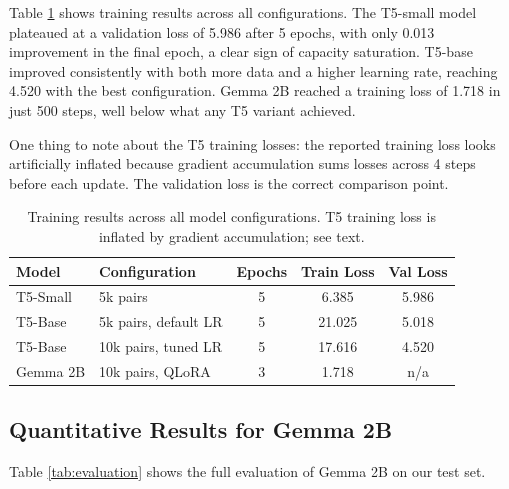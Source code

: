\documentclass{article}
\begin{document}
Table \ref{tab:training_loss} shows training results across all configurations. The T5-small model plateaued at a validation loss of 5.986 after 5 epochs, with only 0.013 improvement in the final epoch, a clear sign of capacity saturation. T5-base improved consistently with both more data and a higher learning rate, reaching 4.520 with the best configuration. Gemma 2B reached a training loss of 1.718 in just 500 steps, well below what any T5 variant achieved.

One thing to note about the T5 training losses: the reported training loss looks artificially inflated because gradient accumulation sums losses across 4 steps before each update. The validation loss is the correct comparison point.

\begin{table}[ht]
\centering
\caption{Training results across all model configurations. T5 training loss is inflated by gradient accumulation; see text.}
\label{tab:training_loss}
\vspace{4pt}
\begin{tabular}{llccc}
\toprule
\textbf{Model} & \textbf{Configuration} & \textbf{Epochs} & \textbf{Train Loss} & \textbf{Val Loss} \\
\midrule
T5-Small & 5k pairs & 5 & 6.385 & 5.986 \\
T5-Base & 5k pairs, default LR & 5 & 21.025 & 5.018 \\
T5-Base & 10k pairs, tuned LR & 5 & 17.616 & 4.520 \\
Gemma 2B & 10k pairs, QLoRA & 3 & 1.718 & n/a \\
\bottomrule
\end{tabular}
\end{table}

\subsection{Quantitative Results for Gemma 2B}

Table \ref{tab:evaluation} shows the full evaluation of Gemma 2B on our test set.
\end{document}
